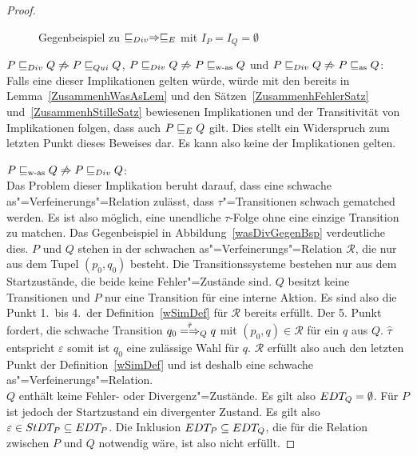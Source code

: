 \begin{proof}
\begin{figure}[htbp]
\begin{center}
      \caption{Gegenbeispiel zu $ \sqsubseteq  _{Div} \Rightarrow  \sqsubseteq  _E$ mit $I_P = I_Q =
      \emptyset$}
      \label{DivEGegenBsp}
    \end{center}
  \end{figure}

  $P  \sqsubseteq  _{Div} Q \not\Rightarrow P  \sqsubseteq  _{Qui} Q$, $P  \sqsubseteq  _{Div} Q \not\Rightarrow P \sqsubseteq _{\mathrm{w}\text{-}\mathrm{as}}
  Q$ und $P  \sqsubseteq  _{Div} Q \not\Rightarrow P \sqsubseteq _{\mathrm{as}} Q$:\\
  Falls eine dieser Implikationen gelten würde, würde mit den bereits in
  Lemma~\ref{ZusammenhWasAsLem} und den Sätzen~\ref{ZusammenhFehlerSatz}
  und~\ref{ZusammenhStilleSatz} bewiesenen Implikationen und der Transitivität
  von Implikationen folgen, dass auch $P  \sqsubseteq  _E Q$ gilt. Dies stellt ein
  Widerspruch zum letzten Punkt dieses Beweises dar. Es kann also keine der
  Implikationen gelten.

  $P \sqsubseteq _{\mathrm{w}\text{-}\mathrm{as}} Q \not\Rightarrow P  \sqsubseteq  _{Div} Q$:\\
  Das Problem dieser Implikation beruht darauf, dass eine schwache
  as"=Verfeinerungs"=Relation zulässt, dass $\tau$"=Transitionen schwach
  gematched werden. Es ist also möglich, eine unendliche $\tau$-Folge ohne eine
  einzige Transition zu matchen. Das Gegenbeispiel in
  Abbildung~\ref{wasDivGegenBsp} verdeutliche dies. $P$ und $Q$ stehen in der
  schwachen as"=Verfeinerungs"=Relation $\mathcal{R}$, die nur aus dem Tupel
  $(p_0,q_0)$ besteht. Die Transitionssysteme bestehen nur aus dem
  Startzustände, die beide keine Fehler"=Zustände sind. $Q$ besitzt keine
  Transitionen und $P$ nur eine Transition für eine interne Aktion. Es sind
  also die Punkt 1.\ bis 4.\ der Definition~\ref{wSimDef} für $\mathcal{R}$
  bereits erfüllt. Der 5. Punkt fordert, die schwache Transition $q_0
  \weakmay[\hat{\tau}]_Q q$ mit $(p_0,q) \in \mathcal{R}$ für ein $q$ aus $Q$.
  $\hat{\tau}$ entspricht $\varepsilon$ somit ist $q_0$ eine zulässige Wahl für
  $q$. $\mathcal{R}$ erfüllt also auch den letzten Punkt der
  Definition~\ref{wSimDef} und ist deshalb eine schwache
  as"=Verfeinerungs"=Relation.\\
  $Q$ enthält keine Fehler- oder Divergenz"=Zustände. Es gilt also $EDT _Q=
  \emptyset$. Für $P$ ist jedoch der Startzustand ein divergenter Zustand. Es
  gilt also $\varepsilon \in StDT _P\subseteq EDT _P$. Die Inklusion $EDT _P
  \subseteq EDT _Q$, die für die Relation \DRel{} zwischen $P$ und $Q$
  notwendig wäre, ist also nicht erfüllt.


\end{proof}
